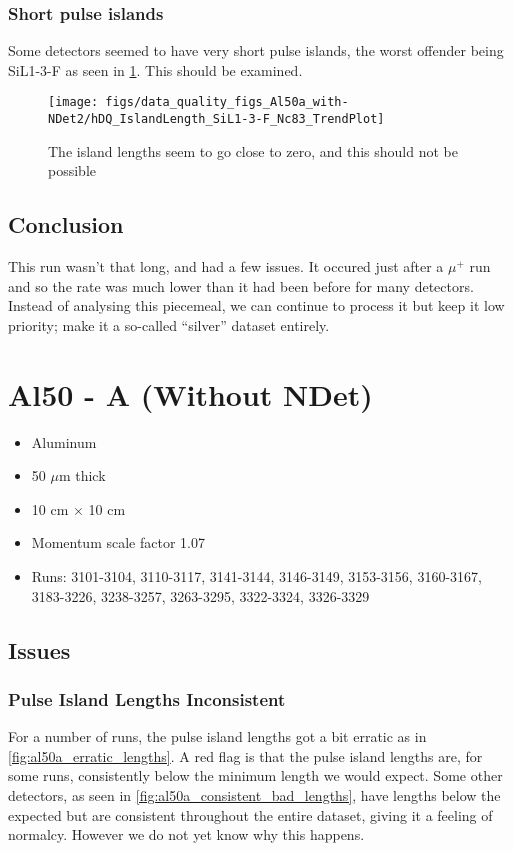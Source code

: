 \documentclass[a4paper]{article}
\begin{document}
\subsubsection{Short pulse islands}
\label{sec:al50andet2_length}

Some detectors seemed to have very short pulse islands, the worst offender being SiL1-3-F as seen in \ref{fig:al50andet2_length}.
This should be examined.

\begin{figure}
  \centering
  \texttt{[image: figs/data\_quality\_figs\_Al50a\_with-NDet2/hDQ\_IslandLength\_SiL1-3-F\_Nc83\_TrendPlot]}
  \caption{The island lengths seem to go close to zero, and this should not be possible}
  \label{fig:al50andet2_length}
\end{figure}

\subsection{Conclusion}

This run wasn't that long, and had a few issues. It occured just after a $\mu^+$ run and so the rate was
much lower than it had been before for many detectors. Instead of analysing this piecemeal, we can continue to process
it but keep it low priority; make it a so-called ``silver'' dataset entirely.


\section{Al50 - A (Without NDet)}
\begin{itemize}
  \item Aluminum
  \item 50 $\mu$m thick
  \item 10 cm $\times$ 10 cm
  \item Momentum scale factor 1.07
  \item Runs:
    3101-3104, 3110-3117, 3141-3144,
    3146-3149, 3153-3156, 3160-3167,
    3183-3226, 3238-3257, 3263-3295,
    3322-3324, 3326-3329
\end{itemize}


\subsection{Issues}

\subsubsection{Pulse Island Lengths Inconsistent}
\label{sec:al50a_tpi_length_incosnsistent}
For a number of runs, the pulse island lengths got a bit erratic as in \ref{fig:al50a_erratic_lengths}.
A red flag is that the pulse island lengths are, for some runs, consistently below the minimum length we would expect.
Some other detectors, as seen in \ref{fig:al50a_consistent_bad_lengths}, have lengths below the expected but
are consistent throughout the entire dataset, giving it a feeling of normalcy. However we do not yet know why this happens.
\end{document}
